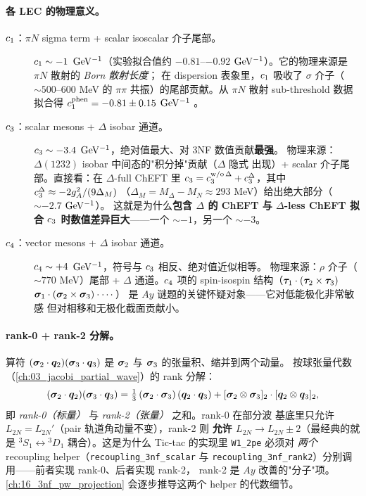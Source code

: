 \paragraph{各 LEC 的物理意义。}
\begin{description}
\item[\(c_1\)：\(\pi N\) sigma term + scalar isoscalar 介子尾部。]
\(c_1 \sim -1\) \(\rm GeV^{-1}\)（实验拟合值约 \(-0.81\)–\(-0.92\)
\(\rm GeV^{-1}\)）。它的物理来源是 \(\pi N\) 散射的 \emph{Born 散射长度}；
在 dispersion 表象里，\(c_1\) 吸收了 \(\sigma\) 介子（\(\sim 500\)–\(600\) MeV
的 \(\pi\pi\) 共振）的尾部贡献。从 \(\pi N\) 散射 sub-threshold 数据
拟合得 \(c_1^{\rm phen} = -0.81 \pm 0.15\) \(\rm GeV^{-1}\)
\cite{Epelbaum2002NLO3NF}。
\item[\(c_3\)：scalar mesons + \(\Delta\) isobar 通道。]
\(c_3 \sim -3.4\) \(\rm GeV^{-1}\)，绝对值最大、对 3NF 数值贡献\textbf{最强}。
物理来源：\(\Delta(1232)\) isobar 中间态的"积分掉"贡献（\(\Delta\) 隐式
出现）+ scalar 介子尾部。直接看：在 \(\Delta\)-full ChEFT 里
\(c_3 = c_3^{\rm w/o\,\Delta} + c_3^{\Delta}\)，其中
\(c_3^{\Delta} \approx -2 g_A^2/(9 \Delta_M)\) （\(\Delta_M = M_\Delta - M_N
\approx 293\) MeV）给出绝大部分（\(\sim -2.7\) \(\rm GeV^{-1}\)）。
这就是为什么\textbf{包含 \(\Delta\) 的 ChEFT 与 \(\Delta\)-less ChEFT
拟合 \(c_3\) 时数值差异巨大}——一个 \(\sim -1\)，另一个 \(\sim -3\)。
\item[\(c_4\)：vector mesons + \(\Delta\) isobar 通道。]
\(c_4 \sim +4\) \(\rm GeV^{-1}\)，符号与 \(c_3\) 相反、绝对值近似相等。
物理来源：\(\rho\) 介子（\(\sim 770\) MeV）尾部 + \(\Delta\) 通道。\(c_4\)
项的 spin-isospin 结构（\(\bm{\tau}_1 \cdot (\bm{\tau}_2 \times \bm{\tau}_3)\)
\(\bm{\sigma}_1 \cdot (\bm{\sigma}_2 \times \bm{\sigma}_3) \cdot \cdots\)）
是 \(Ay\) 谜题的关键怀疑对象——它对低能极化非常敏感
但对相移和无极化截面贡献小。
\end{description}

\paragraph{rank-0 + rank-2 分解。}
算符 \((\bm{\sigma}_2 \cdot \bm{q}_2)(\bm{\sigma}_3 \cdot \bm{q}_3)\)
是 \(\bm{\sigma}_2\) 与 \(\bm{\sigma}_3\) 的张量积、缩并到两个动量。
按球张量代数（\cref{ch:03_jacobi_partial_wave}）的 rank 分解：
\begin{equation}
\label{eq:ch15-rank0-rank2-2pe}
(\bm{\sigma}_2 \cdot \bm{q}_2)(\bm{\sigma}_3 \cdot \bm{q}_3)
= \tfrac{1}{3}\,(\bm{\sigma}_2 \cdot \bm{\sigma}_3)\,(\bm{q}_2 \cdot \bm{q}_3)
+ [\bm{\sigma}_2 \otimes \bm{\sigma}_3]_2 \cdot [\bm{q}_2 \otimes \bm{q}_3]_2,
\end{equation}
即 \emph{rank-0（标量）} 与 \emph{rank-2（张量）} 之和。rank-0 在部分波
基底里只允许 \(L_{2N} = L_{2N}'\)（pair 轨道角动量不变），rank-2 则
\textbf{允许 \(L_{2N} \to L_{2N} \pm 2\)}（最经典的就是 \({}^3S_1 \leftrightarrow {}^3D_1\)
耦合）。这是为什么 Tic-tac 的实现里 \texttt{W1\_2pe} 必须对 \emph{两个}
recoupling helper（\texttt{recoupling\_3nf\_scalar} 与
\texttt{recoupling\_3nf\_rank2}）分别调用——前者实现 rank-0、后者实现 rank-2，
rank-2 是 \(Ay\) 改善的"分子"项。
\cref{ch:16_3nf_pw_projection} 会逐步推导这两个 helper 的代数细节。


